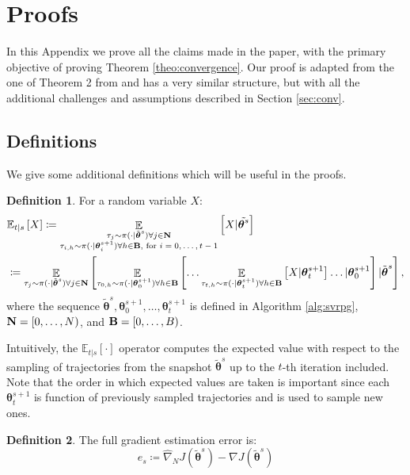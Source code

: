 \documentclass{article}
\theoremstyle{remark}
\theoremstyle{definition}
\newtheorem{definition}{Definition}[section]
\DeclareMathOperator*{\EV}{\mathbb{E}}
\newcommand{\EVV}[2][\ppvect \in \ppspace]{\EV_{#1}\left[{#2}\right]}
\newcommand{\vtheta}{\boldsymbol{\theta}}
\newcommand{\gradJ}[1]{\nabla J(#1)}
\newcommand{\gradApp}[2]{\widehat{\nabla}_{#2}J(#1)}
\newcommand{\Ets}[2][t]{\mathbb{E}_{#1\vert s}\left[#2\right]}
\begin{document}
\section{Proofs}\label{app:proofs}
In this Appendix we prove all the claims made in the paper, with the primary objective of proving Theorem \ref{theo:convergence}. Our proof is adapted from the one of Theorem 2 from \cite{reddi2016stochastic} and has a very similar structure, but with all the additional challenges and assumptions described in Section \ref{sec:conv}.

\subsection*{Definitions}
We give some additional definitions which will be useful in the proofs.
\begin{definition}
For a random variable $X$:
\begin{align*}
	&\mathbb{E}_{t\vert s}\left[X\right] \coloneqq 
		\mathop{\mathbb{E}}_{\substack{\tau_j\sim\pi(\cdot\vert\tilde{\vtheta}^s)\forall j \in {\it {\bf N}} \\ \tau_{i,h}\sim\pi(\cdot\vert\vtheta^{s+1}_i) \forall h \in {\it {\bf B}}, \text{ for $i=0,\dots,t-1$}}}{\left[X \vert \tilde{\vtheta^s}\right]} \\
	&\coloneqq \EVV[\tau_j\sim\pi(\cdot\vert\tilde{\vtheta}^s)\forall j \in {\it {\bf N}}]{
			\EVV[\tau_{0,h}\sim\pi(\cdot\vert\vtheta_0^{s+1}) \forall h \in {\it {\bf B}}]
				{\dots
					\EVV[\tau_{t,h}\sim\pi(\cdot\vert\vtheta_t^{s+1})\forall h \in {\it {\bf B}}]
						{X\vert\vtheta_t^{s+1}}
				 \dots
			\vert\vtheta_0^{s+1}}
		\vert\tilde{\vtheta}^s},
\end{align*}
where the sequence $\tilde{\vtheta}^s,\vtheta_0^{s+1},\dots,\vtheta_t^{s+1}$ is defined in Algorithm \ref{alg:svrpg}, ${\it {\bf N}} = [0,\dots,N)$, and ${\it {\bf B}} = [0,\dots,B)$. 
\end{definition}
Intuitively, the $\Ets{\cdot}$ operator computes the expected value with respect to the sampling of trajectories from the snapshot $\tilde{\vtheta}^s$ up to the $t$-th iteration included. Note that the order in which expected values are taken is important since each $\vtheta_{t}^{s+1}$ is function of previously sampled trajectories and is used to sample new ones.

\begin{definition}
The full gradient estimation error is:
\[
	e_s \coloneqq \gradApp{\tilde{\vtheta}^s}{N} - \gradJ{\tilde{\vtheta}^s} 
\]
\end{definition}
\end{document}
